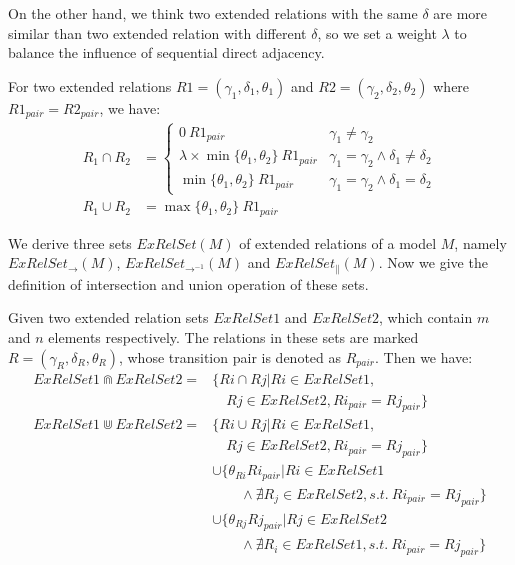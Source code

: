 \documentclass{llncs}
\begin{document}
On the other hand, we think two extended relations with the same $\delta$ are more similar than two extended relation with different $\delta$, so we set a weight $\lambda$ to balance the influence of sequential direct adjacency.

For two extended relations $R1=(\gamma_{1},\delta_{1},\theta_{1})$ and $R2=(\gamma_{2},\delta_{2},\theta_{2})$ where $R1_{pair}=R2_{pair}$, we have:
\begin{equation}\label{eq:relationOperations}
	\begin{aligned}
		R_{1}\cap R_{2}&=
			\begin{cases}
				0~R1_{pair}&	\gamma_{1}\neq\gamma_{2}\\
				\lambda\times\min\{\theta_{1},\theta_{2}\}~R1_{pair}&	\gamma_{1}=\gamma_{2}\wedge\delta_{1}\neq\delta_{2}\\
				\min\{\theta_{1},\theta_{2}\}~R1_{pair}&	\gamma_{1}=\gamma_{2}\wedge\delta_{1}=\delta_{2}
			\end{cases}\\
		R_{1}\cup R_{2}&=	\max\{\theta_{1},\theta_{2}\}~R1_{pair}
	\end{aligned}
\end{equation}

We derive three sets $ExRelSet(M)$ of extended relations of a model $M$, namely $ExRelSet_{\rightarrow}(M)$, $ExRelSet_{\rightarrow^{-1}}(M)$ and $ExRelSet_{\parallel}(M)$. Now we give the definition of intersection and union operation of these sets.

\begin{definition}\label{def:relSetOperations}
Given two extended relation sets $ExRelSet1$ and $ExRelSet2$, which contain $m$ and $n$ elements respectively. The relations in these sets are marked $R=(\gamma_{R},\delta_{R},\theta_{R})$, whose transition pair is denoted as $R_{pair}$. Then we have:
	\begin{equation}\label{eq:relSetOperations}
		\begin{aligned}
			ExRelSet1\Cap ExRelSet2=&\{Ri\cap Rj|Ri\in ExRelSet1,\\
			&\quad Rj\in ExRelSet2,Ri_{pair}=Rj_{pair}\}\\
			ExRelSet1\Cup ExRelSet2=&\{Ri\cup Rj|Ri\in ExRelSet1,\\
			&\quad Rj\in ExRelSet2,Ri_{pair}=Rj_{pair}\}\\
			&\cup\{\theta_{Ri}Ri_{pair}|Ri\in ExRelSet1\\
			&\qquad \wedge\nexists R_{j}\in ExRelSet2,s.t.~Ri_{pair}=Rj_{pair}\}\\
			&\cup\{\theta_{Rj}Rj_{pair}|Rj\in ExRelSet2\\
			&\qquad \wedge\nexists R_{i}\in ExRelSet1,s.t.~Ri_{pair}=Rj_{pair}\}
		\end{aligned}
	\end{equation}
\end{definition}
\end{document}
